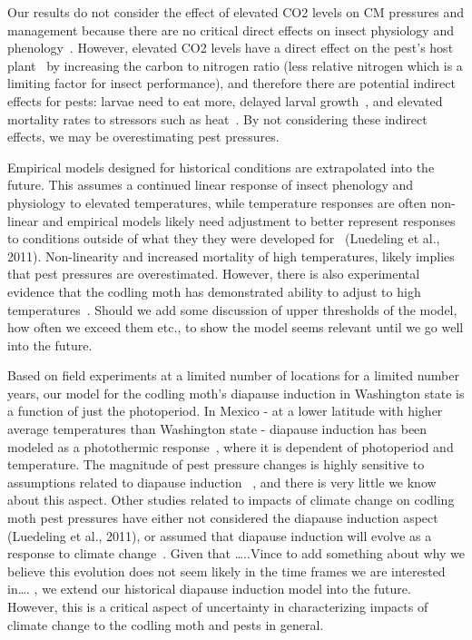\documentclass[12pt]{article}
\theoremstyle{plain}
\theoremstyle{definition}
\theoremstyle{definition}
\begin{document}
 Our results do not consider the effect of 
 elevated CO2 levels on CM pressures 
 and management because there are no 
 critical direct effects on insect physiology 
 and phenology~\cite{Patterson1999}. 
 However, elevated CO2 levels have a direct 
 effect on the pest’s host plant~\cite{Patterson1999} 
 by increasing the carbon to nitrogen ratio 
 (less relative nitrogen which is a limiting factor 
 for insect performance), and therefore there are 
 potential indirect effects for pests: larvae need 
 to eat more, delayed larval growth~\cite{Stiling_1823}, 
 and elevated 
 mortality rates to stressors such as heat~\cite{Lindroth_1996}. 
 By not considering these 
 indirect effects, we may be overestimating pest pressures.

Empirical models designed for historical conditions 
are extrapolated into the future. This assumes a 
continued linear response of insect phenology and 
physiology to elevated temperatures, while temperature 
responses are often non-linear and empirical models 
likely need adjustment to better represent responses 
to conditions outside of what they they were developed 
for~\cite{Andrea_Maiorano} (Luedeling et al., 2011). 
Non-linearity and increased mortality of high temperatures, 
likely implies that pest pressures are overestimated. 
However, there is also experimental evidence that the 
codling moth has demonstrated ability to adjust to 
high temperatures~\cite{Frank_Rapid}. 
Should we add some discussion of upper thresholds 
of the model, how often we exceed them etc., to show the 
model seems relevant until we go well into the future. 

Based on field experiments at a limited number 
of locations for a limited number years, our model 
for the codling moth’s diapause induction in 
Washington state is a function of just the photoperiod. 
In Mexico - at a lower latitude with higher average 
temperatures than Washington state - diapause 
induction has been modeled as a photothermic 
response~\cite{Cuellar_2005}, where 
it is dependent of photoperiod and temperature. 
The magnitude of pest pressure changes is highly 
sensitive to assumptions related to diapause induction 
~\cite{Stoeckli_2012}, and there is very little we 
know about this aspect. Other studies related to 
impacts of climate change on codling moth pest 
pressures have either not considered the diapause 
induction aspect~\cite{Juszczak2013} (Luedeling et al., 2011), 
or assumed that diapause induction will evolve as a 
response to climate change~\cite{Stoeckli_2012}. 
Given that …..Vince to add something about why 
we believe this evolution does not seem likely in 
the time frames we are interested in…. , we extend 
our historical diapause induction model into 
the future. However, this is a critical aspect of 
uncertainty in characterizing impacts of climate 
change to the codling moth and pests in general.
\end{document}
